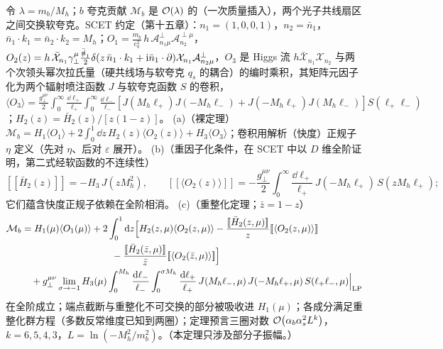 \begin{theorem}\label{thm:front-hgg}
令 $\lambda=m_b/M_h$；$b$ 夸克贡献 $\mathcal M_b$ 是 $\mathcal{O}\!\left(\lambda\right)$ 的（一次质量插入），两个光子共线扇区之间交换软夸克。SCET 约定（第十五章）：$n_1=(1,0,0,1)$，$n_2=\bar n_1$，$\bar n_1\cdot k_1=\bar n_2\cdot k_2=M_h$；$O_1=\frac{m_b}{e_b^2}\,h\,\mathcal A^\perp_{n_1\mu}\mathcal A^{\perp\mu}_{n_2}$，$O_2(z)=h\,\bar{\mathcal X}_{n_1}\gamma_\perp^\mu\frac{\bar{\slashed{n}}_1}{2}\delta(z\,\bar n_1\cdot k_1+\mathrm{i}\bar n_1\cdot\partial)\mathcal X_{n_1}\mathcal A^\perp_{n_2\mu}$，$O_3$ 是 Higgs 流 $h\bar{\mathcal X}_{n_1}\mathcal X_{n_2}$ 与两个次领头幂次拉氏量（硬共线场与软夸克 $q_s$ 的耦合）的编时乘积，其矩阵元因子化为两个辐射喷注函数 $J$ 与软夸克函数 $S$ 的卷积，$\langle O_3\rangle=\frac{g_\perp^{\mu\nu}}2\int_0^\infty\frac{\dd\ell_+}{\ell_+}\int_0^\infty\frac{\dd\ell_-}{\ell_-}[J(M_h\ell_+)J(-M_h\ell_-)+J(-M_h\ell_+)J(M_h\ell_-)]S(\ell_+\ell_-)$；$H_2(z)=\bar H_2(z)/[z(1-z)]$。
(a)（裸定理）$\mathcal M_b=H_1\langle O_1\rangle+2\int_0^1\dd z\,H_2(z)\langle O_2(z)\rangle+H_3\langle O_3\rangle$；卷积用解析（快度）正规子 $\eta$ 定义（先对 $\eta$、后对 $\varepsilon$ 展开）\cite{Liu:2019oav}。
(b)（重因子化条件，在 SCET 中以 $D$ 维全阶证明，第二式经软函数的不连续性\cite[第~3~节]{Liu:2020wbn}）
\begin{equation}\label{eq:front-refact}
[\![\bar H_2(z)]\!]=-H_3\,J(zM_h^2),\qquad
[\![\langle O_2(z)\rangle]\!]=-\frac{g_\perp^{\mu\nu}}2\int_0^\infty\frac{\dd\ell_+}{\ell_+}\,J(-M_h\ell_+)\,S(zM_h\ell_+);
\end{equation}
它们蕴含快度正规子依赖在全阶相消。
(c)（重整化定理\cite[式~(4.1)]{Liu:2020wbn}；$\bar z=1-z$）
\begin{equation}\label{eq:front-hgg-ren}
\begin{split}
\mathcal M_b&=H_1(\mu)\langle O_1(\mu)\rangle+2\int_0^1\dd z\Bigl[H_2(z,\mu)\langle O_2(z,\mu)\rangle-\frac{[\![\bar H_2(z,\mu)]\!]}{z}[\![\langle O_2(z,\mu)\rangle]\!]\\
&\hspace{9.5em}-\frac{[\![\bar H_2(\bar z,\mu)]\!]}{\bar z}[\![\langle O_2(\bar z,\mu)\rangle]\!]\Bigr]\\
&\quad+g_\perp^{\mu\nu}\lim_{\sigma\to-1}H_3(\mu)\int_0^{M_h}\frac{\dd\ell_-}{\ell_-}\int_0^{\sigma M_h}\frac{\dd\ell_+}{\ell_+}\,J(M_h\ell_-,\mu)\,J(-M_h\ell_+,\mu)\,S(\ell_+\ell_-,\mu)\Bigr|_{\rm LP}
\end{split}
\end{equation}
在全阶成立；端点截断与重整化不可交换的部分被吸收进 $H_1(\mu)$；各成分满足重整化群方程（多数反常维度已知到两圈）；定理预言三圈对数 $\mathcal{O}\!\left(\alpha_b\alpha_s^2L^k\right)$，$k=6,5,4,3$，$L=\ln(-M_h^2/m_b^2)$。（本定理只涉及部分子振幅。）
\end{theorem}

